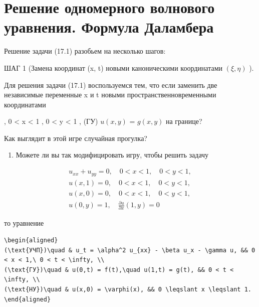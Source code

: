 \documentclass[
  ukrainian,
]{article}
\providecommand{\tightlist}{%
  \setlength{\itemsep}{0pt}\setlength{\parskip}{0pt}}
\begin{document}
\section{Решение одномерного волнового уравнения. Формула
Даламбера}\label{ux440ux435ux448ux435ux43dux438ux435-ux43eux434ux43dux43eux43cux435ux440ux43dux43eux433ux43e-ux432ux43eux43bux43dux43eux432ux43eux433ux43e-ux443ux440ux430ux432ux43dux435ux43dux438ux44f.-ux444ux43eux440ux43cux443ux43bux430-ux434ux430ux43bux430ux43cux431ux435ux440ux430}

Решение задачи (17.1) разобьем на несколько шагов:

ШАГ 1 (Замена координат (x, t) новыми каноническими координатами
\((\xi, \eta)\) ).

Для решения задачи (17.1) воспользуемся тем, что если заменить две
независимые переменные x и t новыми пространственновременными
координатами

, 0 \textless{} x \textless{} 1 , 0 \textless{} y \textless{} 1 , (ГУ)
\(u(x, y)\) = \(g(x, y)\) на границе?

Как выглядит в этой игре случайная прогулка?

\begin{enumerate}
\def\labelenumi{\arabic{enumi}.}
\setcounter{enumi}{3}
\tightlist
\item
  Можете ли вы так модифицировать игру, чтобы решить задачу
\end{enumerate}

\[
\begin{array}{l} u_{xx} + u_{yy} = 0, \quad 0 < x < 1, \quad 0 < y < 1, \\ u(x, 1) = 0, \quad 0 < x < 1, \quad 0 < y < 1, \\ u(x, 0) = 0, \quad 0 < x < 1, \quad 0 < y < 1, \\ u(0, y) = 1, \quad \frac{\partial u}{\partial x}(1, y) = 0 \end{array}
\]

то уравнение

\begin{verbatim}
\begin{aligned}
(\text{УЧП})\quad & u_t = \alpha^2 u_{xx} - \beta u_x - \gamma u, && 0 < x < 1,\ 0 < t < \infty, \\
(\text{ГУ})\quad & u(0,t) = f(t),\quad u(1,t) = g(t), && 0 < t < \infty, \\
(\text{НУ})\quad & u(x,0) = \varphi(x), && 0 \leqslant x \leqslant 1.
\end{aligned}
\end{verbatim}
\end{document}
